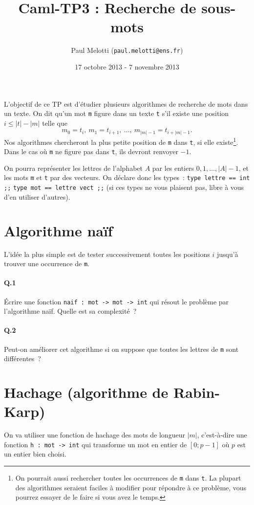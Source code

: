 \documentclass[10pt,a4paper]{article}
\begin{document}
\title{Caml-TP3 : Recherche de sous-mots}
\date{17 octobre 2013 - 7 novembre 2013}
\author{Paul Melotti (\texttt{paul.melotti@ens.fr})}
\maketitle{}

L'objectif de ce TP est d'étudier plusieurs algorithmes de recherche de 
mots dans un texte. On dit qu'un mot \texttt{m} figure dans un texte 
\texttt{t} s'il existe une position $i\leq |t|-|m|$ telle que
\[m_0 = t_i, \ m_1 = t_{i+1},\  \dots, \ m_{|m|-1} = t_{i+|m|-1}. \]
Nos algorithmes chercheront la plus petite position de \texttt{m} dans
\texttt{t}, si elle existe\footnote{On pourrait aussi rechercher toutes les 
occurrences de \texttt{m} dans \texttt{t}. La plupart des algorithmes seraient
faciles à modifier pour répondre à ce problème, vous pourrez essayer de le faire
si vous avez le temps.}. Dans le cas où \texttt{m} ne figure pas 
dans \texttt{t}, ils devront renvoyer $-1$.

On pourra représenter les lettres de l'alphabet $A$ par les entiers 
$0, 1, \dots, |A|-1$, et les mots \texttt{m} et \texttt{t} par des vecteurs. On 
déclare donc les types~: \texttt{type lettre == int ;;} 
\texttt{type mot == lettre vect ;;} (si ces types ne vous plaisent pas, libre à 
vous d'en utiliser d'autres).

\section{Algorithme naïf}
L'idée la plus simple est de tester successivement toutes les positions $i$ 
jusqu'à trouver une occurrence de \texttt{m}.
\paragraph{Q.1} Écrire une fonction \texttt{naif : mot -> mot -> int} qui 
résout le problème par l'algorithme naïf. Quelle est sa complexité~?
\paragraph{Q.2} Peut-on améliorer cet algorithme si on suppose que toutes les
lettres de \texttt{m} sont différentes~?
\section{Hachage (algorithme de Rabin-Karp)}
On va utiliser une fonction de hachage des mots de longueur $|m|$, c'est-à-dire 
une fonction \texttt{h : mot -> int} qui transforme un mot en entier de $[0;p-1]$ où 
$p$ est un entier bien choisi.
\end{document}
